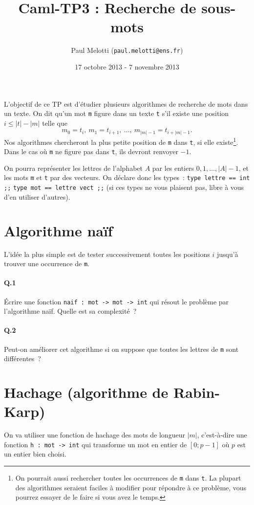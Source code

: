 \documentclass[10pt,a4paper]{article}
\begin{document}
\title{Caml-TP3 : Recherche de sous-mots}
\date{17 octobre 2013 - 7 novembre 2013}
\author{Paul Melotti (\texttt{paul.melotti@ens.fr})}
\maketitle{}

L'objectif de ce TP est d'étudier plusieurs algorithmes de recherche de 
mots dans un texte. On dit qu'un mot \texttt{m} figure dans un texte 
\texttt{t} s'il existe une position $i\leq |t|-|m|$ telle que
\[m_0 = t_i, \ m_1 = t_{i+1},\  \dots, \ m_{|m|-1} = t_{i+|m|-1}. \]
Nos algorithmes chercheront la plus petite position de \texttt{m} dans
\texttt{t}, si elle existe\footnote{On pourrait aussi rechercher toutes les 
occurrences de \texttt{m} dans \texttt{t}. La plupart des algorithmes seraient
faciles à modifier pour répondre à ce problème, vous pourrez essayer de le faire
si vous avez le temps.}. Dans le cas où \texttt{m} ne figure pas 
dans \texttt{t}, ils devront renvoyer $-1$.

On pourra représenter les lettres de l'alphabet $A$ par les entiers 
$0, 1, \dots, |A|-1$, et les mots \texttt{m} et \texttt{t} par des vecteurs. On 
déclare donc les types~: \texttt{type lettre == int ;;} 
\texttt{type mot == lettre vect ;;} (si ces types ne vous plaisent pas, libre à 
vous d'en utiliser d'autres).

\section{Algorithme naïf}
L'idée la plus simple est de tester successivement toutes les positions $i$ 
jusqu'à trouver une occurrence de \texttt{m}.
\paragraph{Q.1} Écrire une fonction \texttt{naif : mot -> mot -> int} qui 
résout le problème par l'algorithme naïf. Quelle est sa complexité~?
\paragraph{Q.2} Peut-on améliorer cet algorithme si on suppose que toutes les
lettres de \texttt{m} sont différentes~?
\section{Hachage (algorithme de Rabin-Karp)}
On va utiliser une fonction de hachage des mots de longueur $|m|$, c'est-à-dire 
une fonction \texttt{h : mot -> int} qui transforme un mot en entier de $[0;p-1]$ où 
$p$ est un entier bien choisi.
\end{document}
